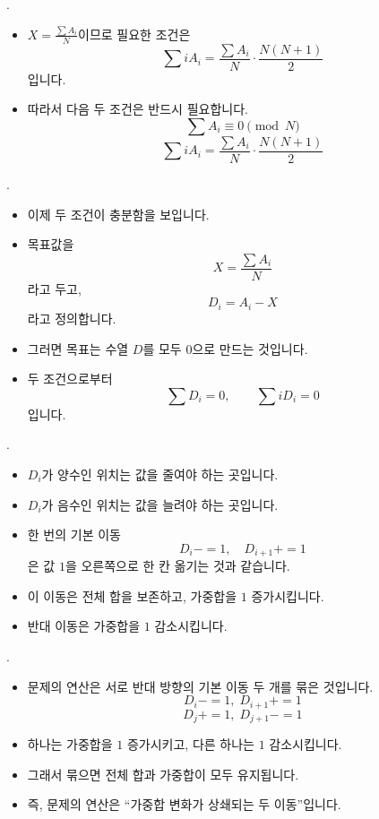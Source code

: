 \begin{frame}{\probno{}. \probtitle{}}
    \begin{itemize}
        \item $X=\frac{\sum A_i}{N}$이므로 필요한 조건은
        \[
            \sum iA_i
            =
            \frac{\sum A_i}{N}\cdot\frac{N(N+1)}{2}
        \]
        입니다.
        \item 따라서 다음 두 조건은 반드시 필요합니다.
        \[
            \sum A_i \equiv 0 \pmod N
        \]
        \[
            \sum iA_i
            =
            \frac{\sum A_i}{N}\cdot\frac{N(N+1)}{2}
        \]
    \end{itemize}
\end{frame}

\begin{frame}{\probno{}. \probtitle{}}
    \begin{itemize}
        \item 이제 두 조건이 충분함을 보입니다.
        \item 목표값을
        \[
            X=\frac{\sum A_i}{N}
        \]
        라고 두고,
        \[
            D_i=A_i-X
        \]
        라고 정의합니다.
        \item 그러면 목표는 수열 $D$를 모두 $0$으로 만드는 것입니다.
        \item 두 조건으로부터
        \[
            \sum D_i=0,\qquad \sum iD_i=0
        \]
        입니다.
    \end{itemize}
\end{frame}

\begin{frame}{\probno{}. \probtitle{}}
    \begin{itemize}
        \item $D_i$가 양수인 위치는 값을 줄여야 하는 곳입니다.
        \item $D_i$가 음수인 위치는 값을 늘려야 하는 곳입니다.
        \item 한 번의 기본 이동
        \[
            D_i{-}{=}1,\quad D_{i+1}{+}{=}1
        \]
        은 값 $1$을 오른쪽으로 한 칸 옮기는 것과 같습니다.
        \item 이 이동은 전체 합을 보존하고, 가중합을 $1$ 증가시킵니다.
        \item 반대 이동은 가중합을 $1$ 감소시킵니다.
    \end{itemize}
\end{frame}

\begin{frame}{\probno{}. \probtitle{}}
    \begin{itemize}
        \item 문제의 연산은 서로 반대 방향의 기본 이동 두 개를 묶은 것입니다.
        \[
            D_i{-}{=}1,\;D_{i+1}{+}{=}1
        \]
        \[
            D_j{+}{=}1,\;D_{j+1}{-}{=}1
        \]
        \item 하나는 가중합을 $1$ 증가시키고, 다른 하나는 $1$ 감소시킵니다.
        \item 그래서 묶으면 전체 합과 가중합이 모두 유지됩니다.
        \item 즉, 문제의 연산은 ``가중합 변화가 상쇄되는 두 이동''입니다.
    \end{itemize}
\end{frame}

